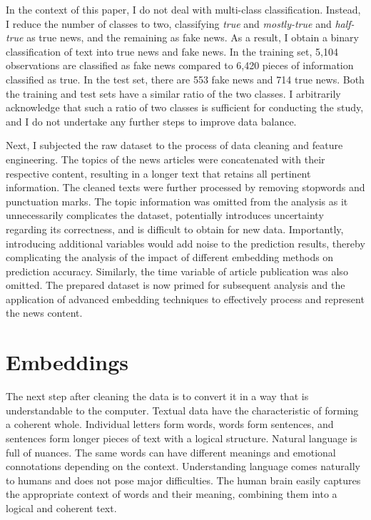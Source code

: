 In the context of this paper, I do not deal with multi-class classification. Instead, I reduce the number of classes to two, classifying \textit{true} and \textit{mostly-true} and \textit{half-true} as true news, and the remaining as fake news. As a result, I obtain a binary classification of text into true news and fake news. In the training set, 5,104 observations are classified as fake news compared to 6,420 pieces of information classified as true. In the test set, there are 553 fake news and 714 true news.  Both the training and test sets have a similar ratio of the two classes. I arbitrarily acknowledge that such a ratio of two classes is sufficient for conducting the study, and I do not undertake any further steps to improve data balance.


Next, I subjected the raw dataset to the process of data cleaning and feature engineering. The topics of the news articles were concatenated with their respective content, resulting in a longer text that retains all pertinent information. The cleaned texts were further processed by removing stopwords and punctuation marks. The topic information was omitted from the analysis as it unnecessarily complicates the dataset, potentially introduces uncertainty regarding its correctness, and is difficult to obtain for new data. Importantly, introducing additional variables would add noise to the prediction results, thereby complicating the analysis of the impact of different embedding methods on prediction accuracy. Similarly, the time variable of article publication was also omitted. The prepared dataset is now primed for subsequent analysis and the application of advanced embedding techniques to effectively process and represent the news content. %

\section{Embeddings}

The next step after cleaning the data is to convert it in a way that is understandable to the computer. Textual data have the characteristic of forming a coherent whole. Individual letters form words, words form sentences, and sentences form longer pieces of text with a logical structure. Natural language is full of nuances. The same words can have different meanings and emotional connotations depending on the context. Understanding language comes naturally to humans and does not pose major difficulties. The human brain easily captures the appropriate context of words and their meaning, combining them into a logical and coherent text.

